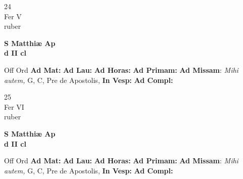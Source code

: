 \documentclass[10pt, openany]{book}
\begin{document}
    \begin{center}
        \begin{minipage}{3.5in}
            \vspace{2em}
            \begin{minipage}{0.5in}
                {\Huge 24} \\
                {\normalsize Fer V} \\
                {\normalsize ruber}
            \end{minipage}
            \begin{minipage}{3.0in}
                \textbf{ \large S Matthiæ Ap \\
                \textnormal{\normalsize d II cl}} \\ 
            \end{minipage}
            \begin{justify}Off Ord
                \textbf{Ad Mat: }
                \textbf{Ad Lau: }
                \textbf{Ad Horas: }
                \textbf{Ad Primam: }\textbf{Ad Missam}: \textit{Mihi autem,} G, C, Pre de Apostolis,  
                \textbf{In Vesp: }
                \textbf{Ad Compl: }
            \end{justify}
        \end{minipage}
    \end{center}

    \begin{center}
        \begin{minipage}{3.5in}
            \vspace{2em}
            \begin{minipage}{0.5in}
                {\Huge 25} \\
                {\normalsize Fer VI} \\
                {\normalsize ruber}
            \end{minipage}
            \begin{minipage}{3.0in}
                \textbf{ \large S Matthiæ Ap \\
                \textnormal{\normalsize d II cl}} \\ 
            \end{minipage}
            \begin{justify}Off Ord
                \textbf{Ad Mat: }
                \textbf{Ad Lau: }
                \textbf{Ad Horas: }
                \textbf{Ad Primam: }\textbf{Ad Missam}: \textit{Mihi autem,} G, C, Pre de Apostolis,  
                \textbf{In Vesp: }
                \textbf{Ad Compl: }
            \end{justify}
        \end{minipage}
    \end{center}
\end{document}
